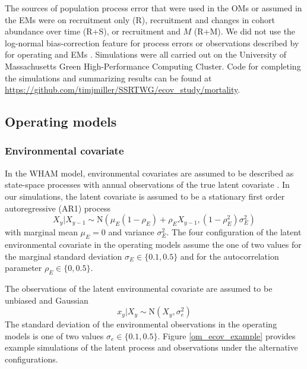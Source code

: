 \documentclass[
  12pt,
]{article}
\begin{document}
The sources of population process error that were used in the OMs or assumed in the EMs were on recruitment only (R), recruitment and changes in cohort abundance over time (R+S), or recruitment and \(M\) (R+M). We did not use the log-normal bias-correction feature for process errors or observations described by \citet{stockmiller21} for operating and EMs \citep{lietal_inreview}. Simulations were all carried out on the University of Massachusetts Green High-Performance Computing Cluster. Code for completing the simulations and summarizing results can be found at \url{https://github.com/timjmiller/SSRTWG/ecov_study/mortality}.

\hypertarget{operating-models}{%
\subsection*{Operating models}\label{operating-models}}

\hypertarget{environmental-covariate}{%
\subsubsection*{Environmental covariate}\label{environmental-covariate}}

In the WHAM model, environmental covariates are assumed to be described as state-space processes with annual observations of the true latent covariate \citep{milleretal16, stockmiller21}. In our simulations, the latent covariate is assumed to be a stationary first order autoregressive (AR1) process
\[
X_y|X_{y-1} \sim \text{N}\left(\mu_E\left(1-\rho_E\right) + \rho_E X_{y-1}, \left(1-\rho_E^2\right)\sigma^2_E\right)
\]
with marginal mean \(\mu_E=0\) and variance \(\sigma^2_E\). The four configuration of the latent environmental covariate in the operating models assume the one of two values for the marginal standard deviation \(\sigma_E \in \{0.1, 0.5\}\) and for the autocorrelation parameter \(\rho_E \in \{0, 0.5\}\).

The observations of the latent environmental covariate are assumed to be unbiased and Gaussian
\[
x_y|X_y \sim \text{N}\left(X_y,\sigma^2_e\right)
\]
The standard deviation of the environmental observations in the operating models is one of two values \(\sigma_e \in \{0.1, 0.5\}\). Figure \ref{om_ecov_example} provides example simulations of the latent process and observations under the alternative configurations.
\end{document}
